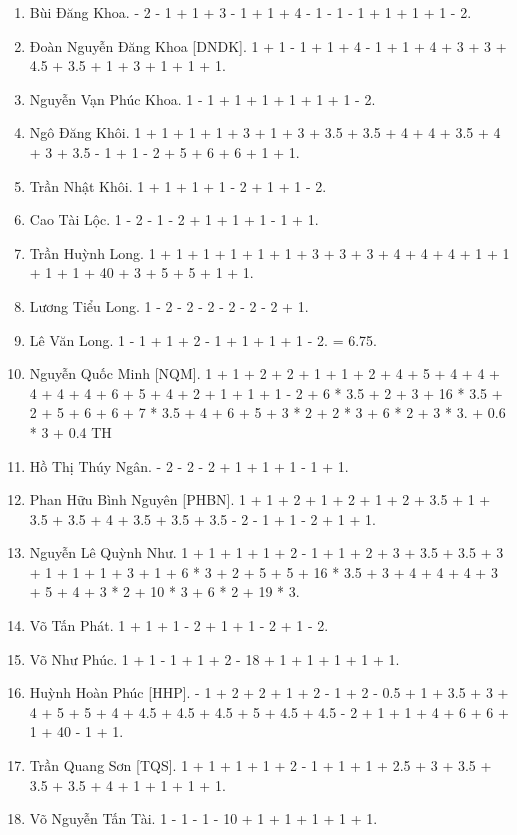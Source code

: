 \documentclass{article}
\begin{document}
\begin{enumerate}
	\item {\sc Bùi Đăng Khoa.} - 2 - 1 + 1 + 3 - 1 + 1 + 4 - 1 - 1 - 1 + 1 + 1 + 1 - 2.
	\item {\sc Đoàn Nguyễn Đăng Khoa [DNDK].} 1 + 1 - 1 + 1 + 4 - 1 + 1 + 4 + 3 + 3 + 4.5 + 3.5 + 1 + 3 + 1 + 1 + 1.
	\item {\sc Nguyễn Vạn Phúc Khoa.} 1 - 1 + 1 + 1 + 1 + 1 + 1 - 2.
	\item {\sc Ngô Đăng Khôi.} 1 + 1 + 1 + 1 + 3 + 1 + 3 + 3.5 + 3.5 + 4 + 4 + 3.5 + 4 + 3 + 3.5 - 1 + 1 - 2 + 5 + 6 + 6 + 1 + 1.
	\item {\sc Trần Nhật Khôi.} 1 + 1 + 1 + 1 - 2 + 1 + 1 - 2.
	\item {\sc Cao Tài Lộc.} 1 - 2 - 1 - 2 + 1 + 1 + 1 - 1 + 1.
	\item {\sc Trần Huỳnh Long.} 1 + 1 + 1 + 1 + 1 + 1 + 3 + 3 + 3 + 4 + 4 + 4 + 1 + 1 + 1 + 1 + 40 + 3 + 5 + 5 + 1 + 1.
	\item {\sc Lương Tiểu Long.} 1 - 2 - 2 - 2 - 2 - 2 - 2 + 1.
	\item {\sc Lê Văn Long.} 1 - 1 + 1 + 2 - 1 + 1 + 1 + 1 - 2. = 6.75.
	\item {\sc Nguyễn Quốc Minh [NQM].} 1 + 1 + 2 + 2 + 1 + 1 + 2 + 4 + 5 + 4 + 4 + 4 + 4 + 4 + 6 + 5 + 4 + 2 + 1 + 1 + 1 - 2 + 6 * 3.5 + 2 + 3 + 16 * 3.5 + 2 + 5 + 6 + 6 + 7 * 3.5 + 4 + 6 + 5 + 3 * 2 + 2 * 3 + 6 * 2 + 3 * 3. + 0.6 * 3 + 0.4 TH
	\item {\sc Hồ Thị Thúy Ngân.} - 2 - 2 - 2 + 1 + 1 + 1 - 1 + 1.
	\item {\sc Phan Hữu Bình Nguyên [PHBN].} 1 + 1 + 2 + 1 + 2 + 1 + 2 + 3.5 + 1 + 3.5 + 3.5 + 4 + 3.5 + 3.5 + 3.5 - 2 - 1 + 1 - 2 + 1 + 1.
	\item {\sc Nguyễn Lê Quỳnh Như.} 1 + 1 + 1 + 1 + 2 - 1 + 1 + 2 + 3 + 3.5 + 3.5 + 3 + 1 + 1 + 1 + 3 + 1 + 6 * 3 + 2 + 5 + 5 + 16 * 3.5 + 3 + 4 + 4 + 4 + 3 + 5 + 4 + 3 * 2 + 10 * 3 + 6 * 2 + 19 * 3.
	\item {\sc Võ Tấn Phát.} 1 + 1 + 1 - 2 + 1 + 1 - 2 + 1 - 2.
	\item {\sc Võ Như Phúc.} 1 + 1 - 1 + 1 + 2 - 18 + 1 + 1 + 1 + 1 + 1.
	\item {\sc Huỳnh Hoàn Phúc [HHP].} - 1 + 2 + 2 + 1 + 2 - 1 + 2 - 0.5 + 1 + 3.5 + 3 + 4 + 5 + 5 + 4 + 4.5 + 4.5 + 4.5 + 5 + 4.5 + 4.5 - 2 + 1 + 1 + 4 + 6 + 6 + 1 + 40 - 1 + 1.
	\item {\sc Trần Quang Sơn [TQS].} 1 + 1 + 1 + 1 + 2 - 1 + 1 + 1 + 2.5 + 3 + 3.5 + 3.5 + 3.5 + 4 + 1 + 1 + 1 + 1.
	\item {\sc Võ Nguyễn Tấn Tài.} 1 - 1 - 1 - 10 + 1 + 1 + 1 + 1 + 1.

\end{enumerate}
\end{document}
